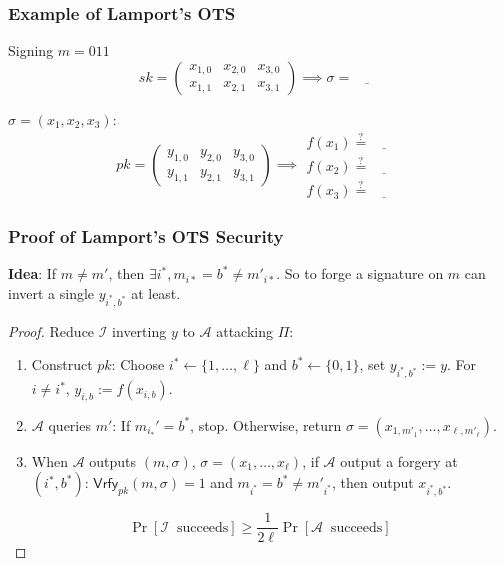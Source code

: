 \begin{frame}\frametitle{Example of Lamport's OTS}
\begin{exampleblock}{Signing $m=011$}
\[ sk =
\begin{pmatrix} { x_{1,0}} & x_{2,0} & x_{3,0} \\
x_{1,1} & { x_{2,1}} & { x_{3,1}} 
\end{pmatrix}
\implies \sigma = \underline{\qquad}\]

$\sigma = (x_1,x_2,x_3)$:
\[ pk =
\begin{pmatrix} { y_{1,0}} & y_{2,0} & y_{3,0} \\
y_{1,1} & { y_{2,1}} & {y_{3,1}} 
\end{pmatrix}
\implies \begin{array}{l} f(x_1) \overset{?}{=} \underline{\qquad} \\ f(x_2) \overset{?}{=} \underline{\qquad} \\ f(x_3) \overset{?}{=} \underline{\qquad} \end{array} \]
\end{exampleblock}
\end{frame}
\begin{frame}\frametitle{Proof of Lamport's OTS Security}
\textbf{Idea}: If $m \neq m'$, then $\exists i^*, m_{i*} = b^* \neq m'_{i*}$. So to forge a signature on $m$ can invert a single $y_{i^*,b^*}$ at least.
\begin{proof}
Reduce $\mathcal{I}$ inverting $y$ to $\mathcal{A}$ attacking $\Pi$:
\begin{enumerate}
\item Construct $pk$: Choose $i^* \gets \{1,\dotsc,\ell\}$ and $b^* \gets \{0,1\}$, set $y_{i^*,b^*} := y$. For $i \neq i^*$, $y_{i,b} := f(x_{i,b})$.
\item $\mathcal{A}$ queries $m'$: If $m_{i_*}' = b^*$, stop. Otherwise, return $\sigma = (x_{1,m'_1},\dots,x_{\ell,m'_{\ell}})$.
\item When $\mathcal{A}$ outputs $(m,\sigma)$, $\sigma=(x_1,\dotsc,x_{\ell})$, if $\mathcal{A}$ output a forgery at $(i^*,b^*)$: $\mathsf{Vrfy}_{pk}(m,\sigma)=1$ and $m_{i^*} =b^* \neq m'_{i^*}$, then output $x_{i^*,b^*}$.
\end{enumerate}
\[\Pr[\mathcal{I}\;\; \text{succeeds} ] \ge \frac{1}{2\ell}\Pr[\mathcal{A}\;\;  \text{succeeds}] \]
\end{proof}
\end{frame}

